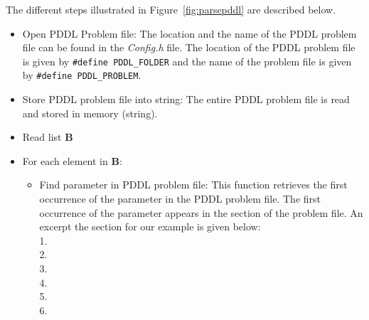 The different steps illustrated in Figure~\ref{fig:parsepddl} are described below.
\begin{itemize}
\item Open PDDL Problem file: The location and the name of the PDDL problem file can be found in the \textit{Config.h} file. The location of the PDDL problem file is given by \texttt{\#define PDDL\_FOLDER} and the name of the problem file is given by \texttt{\#define PDDL\_PROBLEM}.
\item Store PDDL problem file into string: The entire PDDL problem file is read and stored in memory (string).
\item Read list \textbf{B}
\item For each element in \textbf{B}:
\begin{itemize}
\item Find parameter in PDDL problem file: This function retrieves the first occurrence of the parameter in the PDDL problem file. The first occurrence of the parameter appears in the  section of the problem file. An excerpt the  section for our example is given below:\\
{\scriptsize{1.}}\\
{\scriptsize{2.}}\hspace*{5mm}\\
{\scriptsize{3.}}\hspace*{5mm}\\
{\scriptsize{4.}}\hspace*{5mm}\\
{\scriptsize{5.}}\hspace*{5mm}\\
{\scriptsize{6.}}\planobj{)}



\end{itemize}
\end{itemize}
